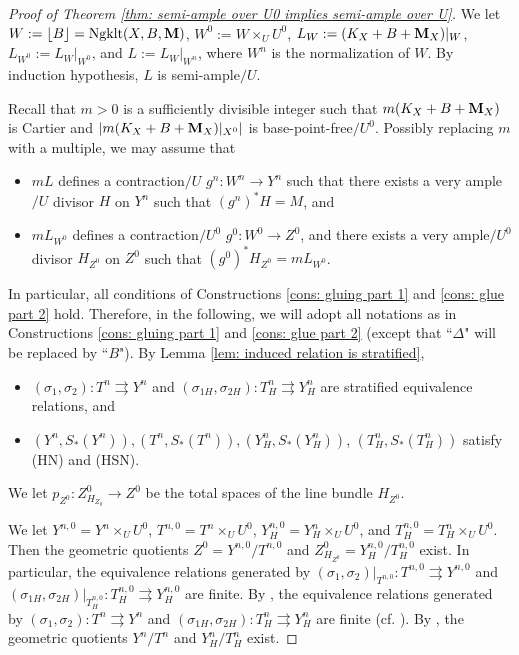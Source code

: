 \documentclass[11pt]{amsart}
\numberwithin{equation}{section}
\newcommand{\Mm}{{\bf{M}}}
\newcommand{\Ngklt}{\operatorname{Ngklt}}
\newcommand{\lf}{\lfloor}
\newcommand{\rf}{\rfloor}
\theoremstyle{definition}
\theoremstyle{definition}
\theoremstyle{definition}
\begin{document}
\begin{proof}[Proof of Theorem \ref{thm: semi-ample over U0 implies semi-ample over U}]
\smallskip

We let $W:=\lf B\rf=\Ngklt(X,B,\Mm)$, $W^0:=W\times_UU^0$, $L_W:=(K_X+B+\Mm_X)|_W$,  $L_{W^0}:=L_W|_{W^0}$, and $L:=L_W|_{W^n}$, where $W^n$ is the normalization of $W$. By induction hypothesis, $L$ is semi-ample$/U$.

Recall that $m>0$ is a sufficiently divisible integer such that $m(K_X+B+\Mm_X)$ is Cartier and $|m(K_X+B+\Mm_X)|_{X^0}|$ is base-point-free$/U^0$. Possibly replacing $m$ with a multiple, we may assume that 
\begin{itemize}
    \item $mL$ defines a contraction$/U$ $g^n: W^n\rightarrow Y^n$ such that there exists a very ample$/U$ divisor $H$ on $Y^n$ such that $(g^n)^*H=M$, and
    \item $mL_{W^0}$ defines a contraction$/U^0$ $g^0: W^0\rightarrow Z^0$, and there exists a very ample$/U^0$ divisor $H_{Z^0}$ on $Z^0$ such that $(g^0)^*H_{Z^0}=mL_{W^0}$.
\end{itemize}
In particular, all conditions of Constructions \ref{cons: gluing part 1} and \ref{cons: glue part 2} hold. Therefore, in the following, we will adopt all notations as in Constructions \ref{cons: gluing part 1} and \ref{cons: glue part 2} (except that ``$\Delta$" will be replaced by ``$B$"). By Lemma \ref{lem: induced relation is stratified},
\begin{itemize}
    \item $(\sigma_1,\sigma_2):T^n\rightrightarrows Y^n$ and $(\sigma_{1H},\sigma_{2H}):T^n_H\rightrightarrows Y^n_H$ are stratified equivalence relations, and
    \item  $(Y^n,S_*(Y^n)),(T^n,S_*(T^n)),(Y^n_H,S_*(Y^n_H))$, $(T^n_H,S_*(T^n_H))$ satisfy (HN) and (HSN).
\end{itemize}
We let  $p_{Z^0}: Z^0_{H_{Z_0}}\rightarrow Z^0$ be the total spaces of the line bundle $H_{Z^0}$.


We let $Y^{n,0}=Y^n\times_UU^0$, $T^{n,0}=T^n\times_UU^0$, $Y^{n,0}_H=Y^n_H\times_UU^0$, and $T^{n,0}_H=T^n_H\times_UU^0$. Then the geometric quotients $Z^0=Y^{n,0}/T^{n,0}$ and $Z^0_{H_{Z^0}}=Y^{n,0}_H/T^{n,0}_{H}$ exist. In particular, the equivalence relations generated by $(\sigma_1,\sigma_2)|_{T^{n,0}}: T^{n,0}\rightrightarrows Y^{n,0}$ and $(\sigma_{1H},\sigma_{2H})|_{T^{n,0}_H}: T^{n,0}_H\rightrightarrows Y^{n,0}_H$ are finite. By \cite[Lemma 9.55]{Kol13}, the equivalence relations generated by $(\sigma_1,\sigma_2):T^n\rightrightarrows Y^n$ and $(\sigma_{1H},\sigma_{2H}):T^n_H\rightrightarrows Y^n_H$ are finite (cf. \cite[Proposition 3.12]{HX13}). By \cite[Theorem 9.21]{Kol13}, the geometric quotients $Y^n/T^n$ and $Y^n_H/T^n_H$ exist. 


\end{proof}
\end{document}
